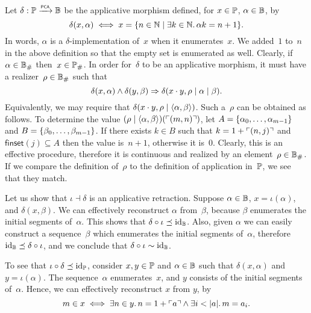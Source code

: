 Let $\delta: \Scott \pcato \Baire$ be the applicative morphism defined,
for  $x \in \Scott$, $\alpha \in \Baire$, by
\begin{equation*}
  \delta(x, \alpha)
  \iff
  x = \set{n \in \NN \such \some{k \in \NN} \alpha k = n + 1}.
\end{equation*}
In words, $\alpha$ is a $\delta$-implementation of~$x$ when it
enumerates~$x$. We added~$1$ to~$n$ in the above definition so that
the empty set is enumerated as well. Clearly, if $\alpha \in \comp{\Baire}$
then~$x \in \comp{\Scott}$. In order for~$\delta$ to be an applicative
morphism, it must have a realizer~$\rho \in \comp{\Baire}$ such that
\begin{equation*}
  \delta(x, \alpha) \land
  \delta(y, \beta)
  \lthen
  \delta(x \cdot y, \rho \mid \alpha \mid \beta).
\end{equation*}
Equivalently, we may require that $\delta(x \cdot y, \rho \mid
\pair{\alpha, \beta})$. Such a~$\rho$ can be obtained as follows.
To determine the value $(\rho \mid \pair{\alpha, \beta})
(\code{(m, n)})$, let $A = \set{\alpha_0, \ldots, \alpha_{m-1}}$
and $B = \set{\beta_0, \ldots, \beta_{m-1}}$. If there exists $k
\in B$ such that $k = 1 + \code{(n, j)}$ and $\mathsf{finset}(j) \subseteq
A$ then the value is~$n+1$, otherwise it is~$0$. Clearly, this is an
effective procedure, therefore it is continuous and realized by an
element~$\rho \in \comp{\Baire}$. If we compare the definition of~$\rho$ to
the definition of application in~$\Scott$, we see that they match.

Let us show that $\iota \dashv \delta$ is an applicative retraction.
Suppose $\alpha \in \Baire$, $x = \iota(\alpha)$, and $\delta(x,
\beta)$. We can effectively reconstruct $\alpha$ from~$\beta$,
because $\beta$ enumerates the initial segments of~$\alpha$. This
shows that $\delta \circ \iota \preceq \id[\Baire]$. Also, given
$\alpha$ we can easily construct a sequence~$\beta$ which enumerates
the initial segments of~$\alpha$, therefore $\id[\Baire] \preceq
\delta \circ \iota$, and we conclude that $\delta \circ \iota \sim
\id[\Baire]$.

To see that $\iota \circ \delta \preceq \id[\Scott]$, consider $x, y \in
\Scott$ and $\alpha \in \Baire$ such that $\delta(x, \alpha)$ and $y =
\iota(\alpha)$. The sequence~$\alpha$ enumerates~$x$, and $y$
consists of the initial segments of~$\alpha$. Hence, we can
effectively reconstruct $x$ from $y$, by
\begin{equation*}
  m \in x
  \iff
  \some{n \in y} n = 1 + \code{a} \land \some{i < |a|} m = a_i.
\end{equation*}


